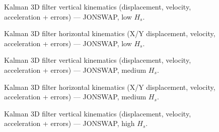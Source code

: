\documentclass[11pt,letterpaper]{article}
\begin{document}
\begin{figure}[H]\centering
  \resizebox{\textwidth}{!}{}
  \caption{Kalman 3D filter vertical kinematics (displacement, velocity, acceleration + errors) — JONSWAP, low $H_s$.}
  \label{fig:w3d_jonswap_low_zkin}
\end{figure}

\begin{figure}[H]\centering
  \resizebox{\textwidth}{!}{}
  \caption{Kalman 3D filter horizontal kinematics (X/Y displacement, velocity, acceleration + errors) — JONSWAP, low $H_s$.}
  \label{fig:w3d_jonswap_low_xykin}
\end{figure}


\begin{figure}[H]\centering
  \resizebox{\textwidth}{!}{}
  \caption{Kalman 3D filter vertical kinematics (displacement, velocity, acceleration + errors) — JONSWAP, medium $H_s$.}
  \label{fig:w3d_jonswap_medium_zkin}
\end{figure}

\begin{figure}[H]\centering
  \resizebox{\textwidth}{!}{}
  \caption{Kalman 3D filter horizontal kinematics (X/Y displacement, velocity, acceleration + errors) — JONSWAP, medium $H_s$.}
  \label{fig:w3d_jonswap_medium_xykin}
\end{figure}


\begin{figure}[H]\centering
  \resizebox{\textwidth}{!}{}
  \caption{Kalman 3D filter vertical kinematics (displacement, velocity, acceleration + errors) — JONSWAP, high $H_s$.}
  \label{fig:w3d_jonswap_high_zkin}
\end{figure}
\end{document}
